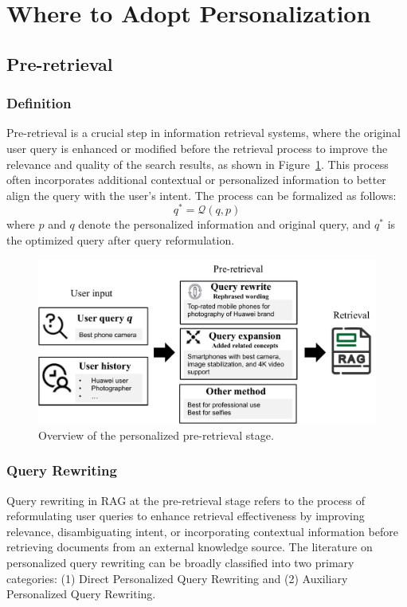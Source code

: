 \section{Where to Adopt Personalization} \label{sec:where}

\subsection{Pre-retrieval} \label{sec:Pre-retrieval}

\subsubsection{\textbf{Definition}} Pre-retrieval is a crucial step in information retrieval systems, where the original user query is enhanced or modified before the retrieval process to improve the relevance and quality of the search results, as shown in Figure~\ref{fig:pre_rag}. This process often incorporates additional contextual or personalized information to better align the query with the user's intent. The process can be formalized as follows:
\begin{equation}
    q^{*} = \mathcal{Q}\left(q,p\right)
\end{equation}
where $p$ and $q$ denote the personalized information and original query, and $q^{*}$ is the optimized query after query reformulation.

\begin{figure}[t]
    \centering
    \includegraphics[width=1\linewidth]{figures/pre_rag.pdf}
    \caption{Overview of the personalized pre-retrieval stage.}
    \label{fig:pre_rag}
\end{figure}

\subsubsection{\textbf{Query Rewriting}}
Query rewriting in RAG at the pre-retrieval stage refers to the process of reformulating user queries to enhance retrieval effectiveness by improving relevance, disambiguating intent, or incorporating contextual information before retrieving documents from an external knowledge source.
The literature on personalized query rewriting can be broadly classified into two primary categories: (1) Direct Personalized Query Rewriting and (2) Auxiliary Personalized Query Rewriting.

